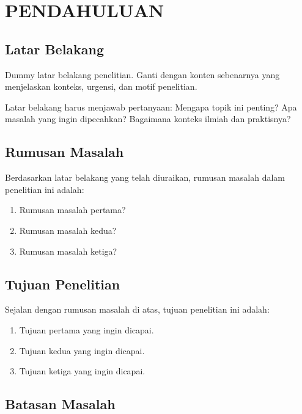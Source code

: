 \chapter{PENDAHULUAN}
\label{bab:pendahuluan}

\section{Latar Belakang}
\label{sec:latar_belakang}

Dummy latar belakang penelitian. Ganti dengan konten sebenarnya yang menjelaskan konteks, urgensi, dan motif penelitian.

Latar belakang harus menjawab pertanyaan: Mengapa topik ini penting? Apa masalah yang ingin dipecahkan? Bagaimana konteks ilmiah dan praktisnya?

\section{Rumusan Masalah}
\label{sec:rumusan_masalah}

Berdasarkan latar belakang yang telah diuraikan, rumusan masalah dalam penelitian ini adalah:

\begin{enumerate}
    \item Rumusan masalah pertama?
    \item Rumusan masalah kedua?
    \item Rumusan masalah ketiga?
\end{enumerate}

\section{Tujuan Penelitian}
\label{sec:tujuan_penelitian}

Sejalan dengan rumusan masalah di atas, tujuan penelitian ini adalah:

\begin{enumerate}
    \item Tujuan pertama yang ingin dicapai.
    \item Tujuan kedua yang ingin dicapai.
    \item Tujuan ketiga yang ingin dicapai.
\end{enumerate}

\section{Batasan Masalah}
\label{sec:batasan_masalah}

